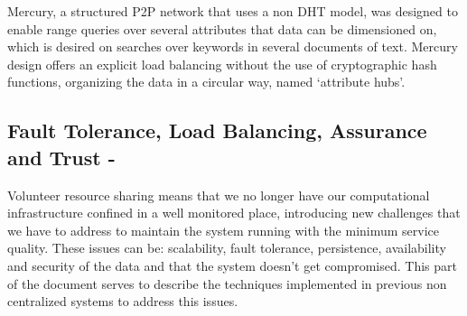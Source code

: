 Mercury\cite{Bharambe}, a structured P2P network that uses a non DHT model, was designed to enable range queries over several attributes that data can be dimensioned on, which is desired on searches over keywords in several documents of text. Mercury design offers an explicit load balancing without the use of cryptographic hash functions, organizing the data in a circular way, named `attribute hubs'.






\subsection{Fault Tolerance, Load Balancing, Assurance and Trust -}

Volunteer resource sharing means that we no longer have our computational infrastructure confined in a well monitored place, introducing new challenges that we have to address \cite{Koloniari2005} to maintain the system running with the minimum service quality. These issues can be: scalability, fault tolerance, persistence, availability and security\cite{Wallach} of the data and that the system doesn't get compromised. This part of the document serves to describe the techniques implemented in previous non centralized systems to address this issues.

